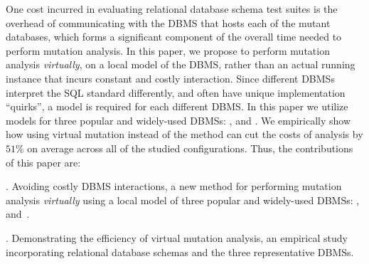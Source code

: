 

One cost incurred in evaluating relational database schema test suites is the overhead of communicating with the DBMS that hosts each of the mutant databases, which forms a significant component of the overall time needed to perform mutation analysis. In this paper, we propose to perform mutation analysis {\it virtually}, on a local model of the DBMS, rather than an actual running instance that incurs constant and costly interaction. Since different DBMSs interpret the SQL standard differently, and often have unique implementation ``quirks'', a model is required for each different DBMS. In this paper we utilize models for three popular and widely-used DBMSs: \HyperSQL, \Postgres and \SQLite. We empirically show how using virtual mutation instead of the \Original method can cut the costs of analysis by $51\%$ on average across all of the studied configurations. Thus, the contributions of this paper are:

\vspace{1mm} . Avoiding costly DBMS interactions, a new method for performing mutation analysis {\it virtually} using a
local model of three popular and widely-used DBMSs: \HyperSQL, \mbox{\Postgres and \SQLite.}

\vspace{1mm} . Demonstrating the efficiency of \mbox{virtual} mutation analysis, an empirical study
incorporating \numschemas relational database schemas and the three representative DBMSs.


